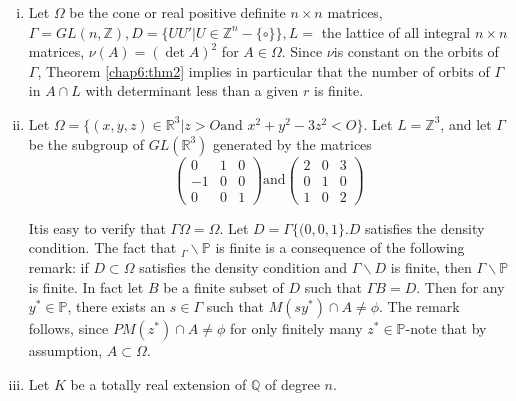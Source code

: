 \begin{examples*}
  \begin{enumerate}[(i)]
  \item Let $\Omega$ be the cone or real positive definite $n \times n$
    matrices, $\Gamma=GL(n,\mathbb{Z}), D=\bigg \{ UU' | U \in
    \mathbb{Z}^n - \{\circ\}\bigg \},L=$ the lattice of all integral $n
    \times n$ matrices, $\nu (A)= (\det A)^2$ for $A \in \Omega$. Since
    $\nu $is constant on the orbits of $\Gamma$, Theorem
    \ref{chap6:thm2} implies in 
    particular that the number of orbits of $\Gamma$ in $A \cap L$ with
    determinant less than a given $r$ is finite. 

  \item Let $\Omega= \bigg \{ (x,y,z) \in \mathbb{R}^3 | z > O \text{
    and } x^2 + y^2 -3z^2 < O \bigg \}$. 
    Let $L =\mathbb{Z}^3$, and let $\Gamma$ be the subgroup of
    $GL(\mathbb{R}^3)$ generated by the matrices 
    \begin{equation*}
      \begin{pmatrix}
        0 & 1 & 0\\-1 & 0 & 0 \\0 & 0 & 1 
      \end{pmatrix}
      \text{and}
      \begin{pmatrix}
        2 & 0 & 3\\0 & 1 & 0 \\1 & 0 & 2 
      \end{pmatrix}
    \end{equation*}
    
    It\pageoriginale is easy to verify that $\Gamma \Omega = \Omega$. Let $D=\Gamma
    \{(0,0,1\}.D$ satisfies the density condition. The fact that $_\Gamma
    \backslash \mathbb{P}$ is finite is a consequence of the following
    remark: if $D \subset \Omega$ satisfies the density condition and $
    \Gamma\backslash D$ is finite, then $\Gamma \backslash \mathbb{P}$ is
    finite. In fact let $B$ be a finite subset of $D$ such that $\Gamma B
    =D$. Then for any $y^* \in \mathbb{P}$, there exists an $s \in \Gamma
    $ such that $M (sy^*)\cap A \neq \phi $. The remark follows, since $PM
    (z^*)\cap A \neq \phi $ for only finitely many $z^* \in
    \mathbb{P}$-note that by assumption, $A \subset \Omega$. 

  \item Let $K$ be a totally real extension of $\mathbb{Q}$ of degree $n$.
  \end{enumerate}
  

\end{examples*}
